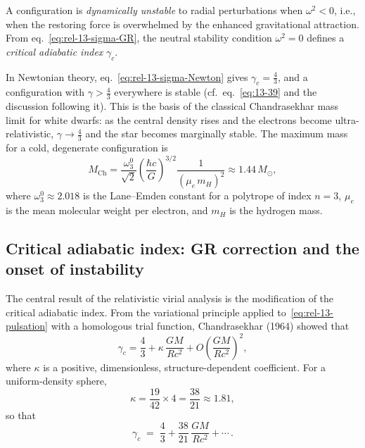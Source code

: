 A configuration is \emph{dynamically unstable} to radial perturbations
when $\omega^{2} < 0$, i.e., when the restoring force is overwhelmed
by the enhanced gravitational attraction.  From
eq.~\eqref{eq:rel-13-sigma-GR}, the neutral stability condition
$\omega^{2}=0$ defines a \emph{critical adiabatic index}
$\gamma_{c}$.

In Newtonian theory, eq.~\eqref{eq:rel-13-sigma-Newton} gives
$\gamma_{c} = \tfrac{4}{3}$, and a configuration with
$\gamma > \tfrac{4}{3}$ everywhere is stable (cf.\
eq.~\eqref{eq:13-39} and the discussion following it).  This is the
basis of the classical Chandrasekhar mass limit for white dwarfs: as
the central density rises and the electrons become ultra-relativistic,
$\gamma \to \tfrac{4}{3}$ and the star becomes marginally stable.
The maximum mass for a cold, degenerate configuration is
\begin{equation}
\label{eq:rel-13-Mch}
M_{\mathrm{Ch}}
  = \frac{\omega_{3}^{0}}{\sqrt{2}}\left(\frac{\hbar c}{G}\right)^{3/2}
    \frac{1}{(\mu_{e}\,m_{H})^{2}}
  \approx 1.44\,M_{\odot},
\end{equation}
where $\omega_{3}^{0} \approx 2.018$ is the Lane--Emden constant for
a polytrope of index $n=3$, $\mu_{e}$ is the mean molecular weight
per electron, and $m_{H}$ is the hydrogen mass.


\subsection{Critical adiabatic index: GR correction and the onset
  of instability}
\label{sec:rel-118-gamma}

The central result of the relativistic virial analysis is the
modification of the critical adiabatic index.  From the variational
principle applied to~\eqref{eq:rel-13-pulsation} with a homologous
trial function, Chandrasekhar (1964) showed that
\begin{equation}
\label{eq:rel-13-gamma-c}
\boxed{
\gamma_{c} = \frac{4}{3}
  + \kappa\,\frac{GM}{Rc^{2}}
  + O\!\left(\frac{GM}{Rc^{2}}\right)^{\!2},
}
\end{equation}
where $\kappa$ is a positive, dimensionless, structure-dependent
coefficient.  For a uniform-density sphere,
\begin{equation}
\label{eq:rel-13-kappa}
\kappa = \frac{19}{42} \times 4 = \frac{38}{21} \approx 1.81,
\end{equation}
so that
\begin{equation}
\label{eq:rel-13-gamma-c-explicit}
\gamma_{c} \;=\; \frac{4}{3}
  + \frac{38}{21}\,\frac{GM}{Rc^{2}}
  + \cdots\,.
\end{equation}

